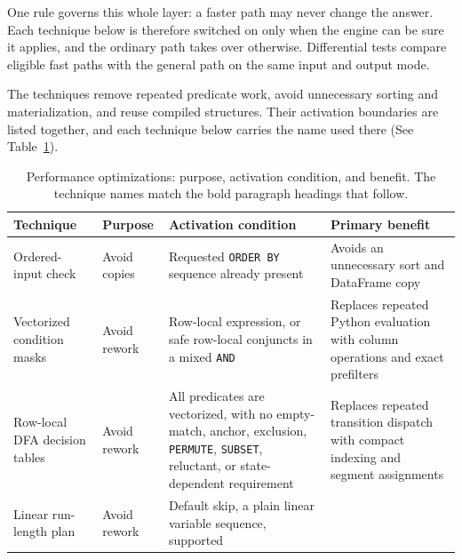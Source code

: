 One rule governs this whole layer: a faster path may never change the
answer.  Each technique below is therefore switched on only when the
engine can be sure it applies, and the ordinary path takes over
otherwise.  Differential tests compare eligible fast paths with the
general path on the same input and output mode.

The techniques remove repeated predicate work, avoid unnecessary
sorting and materialization, and reuse compiled structures.
Their activation boundaries are listed together, and each technique below
carries the name used there (See Table~\ref{tab:perf-summary}).

\begin{table}[htbp]
  \centering
  \caption[Performance optimizations, purpose and activation]{Performance
    optimizations: purpose, activation condition, and benefit.  The
    technique names match the bold paragraph headings that follow.}
  \label{tab:perf-summary}
  \small
  \setlength{\tabcolsep}{3pt}
  \begin{tabularx}{\textwidth}{%
    >{\raggedright\arraybackslash\hyphenpenalty=10000\exhyphenpenalty=10000}p{2.75cm}%
    >{\raggedright\arraybackslash\hyphenpenalty=10000}p{2.05cm}%
    >{\raggedright\arraybackslash}X%
    >{\raggedright\arraybackslash}X}
    \toprule
    \textbf{Technique} & \textbf{Purpose}
      & \textbf{Activation condition} & \textbf{Primary benefit} \\
    \midrule
    Ordered-input check
      & Avoid copies
      & Requested \texttt{ORDER BY} sequence already present
      & Avoids an unnecessary sort and DataFrame copy \\ \addlinespace[5pt]
    Vectorized condition masks
      & Avoid rework
      & Row-local expression, or safe row-local conjuncts in
        a mixed \texttt{AND}
      & Replaces repeated Python evaluation with column operations
        and exact prefilters \\ \addlinespace[5pt]
    Row-local DFA decision tables
      & Avoid rework
      & All predicates are vectorized, with no empty-match, anchor,
        exclusion, \texttt{PERMUTE}, \texttt{SUBSET}, reluctant, or
        state-dependent requirement
      & Replaces repeated transition dispatch with compact indexing
        and segment assignments \\ \addlinespace[5pt]
    Linear run-length plan
      & Avoid rework
      & Default skip, a plain linear variable sequence, supported

\end{tabularx}
\end{table}

